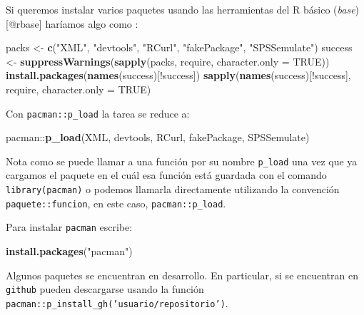 \documentclass[]{article}
\newenvironment{Shaded}{\begin{snugshade}}{\end{snugshade}}
\newcommand{\KeywordTok}[1]{\textcolor[rgb]{0.13,0.29,0.53}{\textbf{{#1}}}}
\newcommand{\DataTypeTok}[1]{\textcolor[rgb]{0.13,0.29,0.53}{{#1}}}
\newcommand{\StringTok}[1]{\textcolor[rgb]{0.31,0.60,0.02}{{#1}}}
\newcommand{\OtherTok}[1]{\textcolor[rgb]{0.56,0.35,0.01}{{#1}}}
\newcommand{\NormalTok}[1]{{#1}}
\begin{document}
Si queremos instalar varios paquetes usando las herramientas del R
básico (\emph{base}) {[}@rbase{]} haríamos algo como
\parencite[ejemplo tomado de][en la viñeta de intrducción al paquete]{pacman}:

\begin{Shaded}
\begin{Highlighting}[]
\NormalTok{packs <-}\StringTok{ }\KeywordTok{c}\NormalTok{(}\StringTok{"XML"}\NormalTok{, }\StringTok{"devtools"}\NormalTok{, }\StringTok{"RCurl"}\NormalTok{, }\StringTok{"fakePackage"}\NormalTok{, }\StringTok{"SPSSemulate"}\NormalTok{)}
\NormalTok{success <-}\StringTok{ }\KeywordTok{suppressWarnings}\NormalTok{(}\KeywordTok{sapply}\NormalTok{(packs, require, }\DataTypeTok{character.only =} \OtherTok{TRUE}\NormalTok{))}
\KeywordTok{install.packages}\NormalTok{(}\KeywordTok{names}\NormalTok{(success)[!success])}
\KeywordTok{sapply}\NormalTok{(}\KeywordTok{names}\NormalTok{(success)[!success], require, }\DataTypeTok{character.only =} \OtherTok{TRUE}\NormalTok{)}
\end{Highlighting}
\end{Shaded}

Con \texttt{pacman::p\_load} la tarea se reduce a:

\begin{Shaded}
\begin{Highlighting}[]
\NormalTok{pacman::}\KeywordTok{p_load}\NormalTok{(XML, devtools, RCurl, fakePackage, SPSSemulate)}
\end{Highlighting}
\end{Shaded}

\begin{curiosidad}
Nota como se puede llamar a una función por su nombre \texttt{p\_load} una vez que 
ya cargamos el paquete en el cuál esa función está guardada con el comando \texttt{library(pacman)}
o podemos llamarla directamente utilizando la convención \texttt{paquete::funcion}, en este caso,
\texttt{pacman::p\_load}.
\end{curiosidad}

Para instalar \texttt{pacman} escribe:

\begin{Shaded}
\begin{Highlighting}[]
\KeywordTok{install.packages}\NormalTok{(}\StringTok{"pacman"}\NormalTok{)}
\end{Highlighting}
\end{Shaded}

Algunos paquetes se encuentran en desarrollo. En particular, si se
encuentran en \texttt{github} pueden descargarse usando la función
\texttt{pacman::p\_install\_gh('usuario/repositorio')}.
\end{document}
